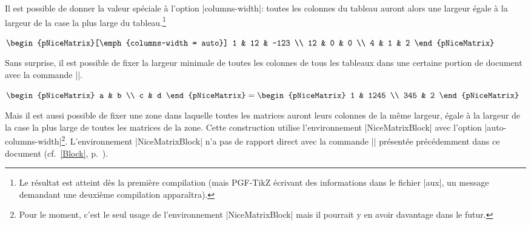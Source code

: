 \documentclass[dvipsnames]{article}
\begin{document}
\medbreak
Il est possible de donner la valeur spéciale  à l'option
|columns-width|: toutes les colonnes du tableau auront alors une largeur égale à
la largeur de la case la plus large du tableau.\footnote{Le résultat est atteint
  dès la première compilation (mais PGF-TikZ écrivant des informations dans le
  fichier |aux|, un message demandant une deuxième compilation
  apparaîtra).}

\nobreak
\medskip
\begin{Code}[width=10cm,show-output,no-cell-nodes]
$\begin{pNiceMatrix}[\emph{columns-width = auto}]
1  & 12 & -123 \\
12 & 0  & 0    \\
4  & 1  & 2
\end{pNiceMatrix}$
\end{Code}

\medbreak
Sans surprise, il est possible de fixer la largeur minimale de toutes les
colonnes de tous les tableaux dans une certaine portion de document avec la
commande |\NiceMatrixOptions|.

\medskip
\begin{Code}[width=8.5cm,show-output,no-cell-nodes]
\emph{}
$\begin{pNiceMatrix}
a & b \\ c & d
\end{pNiceMatrix}
=
\begin{pNiceMatrix}
1   & 1245 \\ 345 & 2
\end{pNiceMatrix}$
\end{Code}


\medskip
{}
Mais il est aussi possible de fixer une zone dans laquelle toutes les matrices
auront leurs colonnes de la même largeur, égale à la largeur de la case la plus
large de toutes les matrices de la zone. Cette construction utilise
l'environnement |{NiceMatrixBlock}| avec l'option
|auto-columns-width|\footnote{Pour le moment, c'est le seul usage de
  l'environnement |{NiceMatrixBlock}| mais il pourrait y en avoir davantage dans
  le futur.}. L'environnement |{NiceMatrixBlock}| n'a pas de rapport direct avec
la commande |\Block| présentée précédemment dans ce document
(cf.~\ref{Block}, p.~\pageref{Block}).
\end{document}
